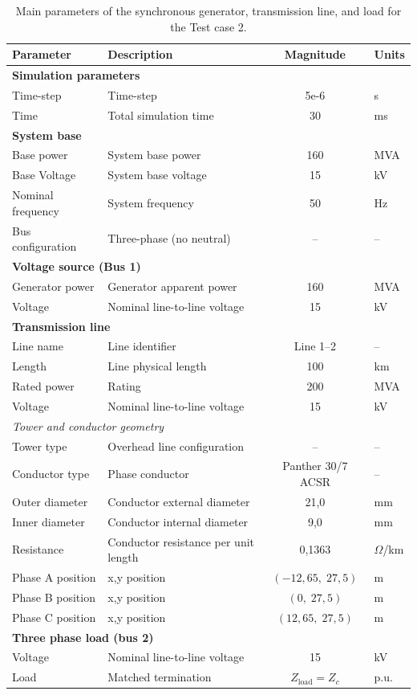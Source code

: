 \begin{table}[htbp!]
\centering
\caption{Main parameters of the synchronous generator, transmission line, and load for the Test case 2.}
\label{tab:test_case_2_parameters}
\renewcommand{\arraystretch}{1.2}
\begin{tabular}{|l|l|c|l|}
\hline
\textbf{Parameter} & \textbf{Description} & \textbf{Magnitude} & \textbf{Units} \\
\hline
\multicolumn{4}{|l|}{\textbf{Simulation parameters}} \\
\hline
Time-step & Time-step & 5e-6 & s \\
Time & Total simulation time & 30 & ms \\
\hline
\multicolumn{4}{|l|}{\textbf{System base}} \\
\hline
Base power & System base power & 160 & MVA \\
Base Voltage & System base voltage & 15 & kV \\
Nominal frequency & System frequency & 50 & Hz \\
Bus configuration & Three-phase (no neutral) & -- & -- \\
\hline
\multicolumn{4}{|l|}{\textbf{Voltage source (Bus 1)}} \\
\hline
Generator power & Generator apparent power & 160 & MVA \\
Voltage & Nominal line-to-line voltage & 15 & kV \\
\hline
\multicolumn{4}{|l|}{\textbf{Transmission line}} \\
\hline
Line name & Line identifier & Line 1--2 & -- \\
Length & Line physical length & 100 & km \\
Rated power & Rating & 200 & MVA \\
Voltage & Nominal line-to-line voltage & 15 & kV \\
\hline
\multicolumn{4}{|l|}{\textit{Tower and conductor geometry}} \\
\hline
Tower type & Overhead line configuration & -- & -- \\
Conductor type & Phase conductor & Panther 30/7 ACSR & -- \\
Outer diameter & Conductor external diameter & 21,0 & mm \\
Inner diameter & Conductor internal diameter & 9,0 & mm \\
Resistance & Conductor resistance per unit length & 0,1363 & $\Omega$/km \\
\hline
Phase A position & x,y position & $(-12,65,\;27,5)$ & m \\
Phase B position & x,y position & $(0,\;27,5)$ & m \\
Phase C position & x,y position & $(12,65,\;27,5)$ & m \\
\hline
\multicolumn{4}{|l|}{\textbf{Three phase load (bus 2)}} \\
\hline
Voltage & Nominal line-to-line voltage & 15 & kV \\
Load & Matched termination & $Z_\text{load} = Z_c$ & p.u. \\
\hline
\end{tabular}
\end{table}

